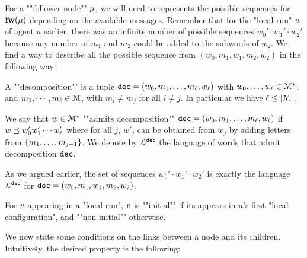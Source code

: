 For a ""follower node"" $\mu$, we will need to represents the possible sequences for $\mathbf{fw}(\mu)$ depending on the available messages. Remember that for the "local run" $u$ of agent $a$ earlier, there was an infinite number of possible sequences $w_0' \cdot w_1' \cdot w_2'$ because any number of $m_1$ and $m_2$ could be added to the subwords of $w_2$. We find a way to describe all the possible sequence from $(w_0, m_1, w_1, m_2, w_2)$ in the following way:

A ""decomposition"" is a tuple $\mathtt{dec} = (w_0, m_1, \ldots, m_\ell, w_\ell)$ with $w_0, \ldots, w_\ell \in \mathcal{M}^*$, and $m_1, \cdots, m_\ell \in \mathcal{M}$, with $m_i \neq m_j$ for all $i\neq j$. In particular we have $\ell \leq |\mathcal{M}|$. 

We say that $w \in \mathcal{M}^*$ ""admits decomposition"" $\mathtt{dec} = (w_0, m_1, \ldots, m_\ell, w_\ell)$ if $w \preceq w'_0 w'_1 \cdots w'_\ell$ where for all $j$, $w'_j$ can be obtained from $w_j$ by adding letters from $\{m_1, \ldots, m_{j-1}\}$.
We denote by $\mathcal{L}^{\mathtt{\mathtt{dec}}}$ the language of words that admit decomposition $\mathtt{dec}$. 

As we argued earlier, the set of sequences $w_0' \cdot w_1' \cdot w_2'$ is exactly the language $\mathcal{L}^{\mathtt{\mathtt{dec}}}$ for $\mathtt{dec} = (w_0, m_1, w_1, m_2, w_2)$.

For $v$ appearing in a "local run", $v$ is ""initial"" if its appears in $u$'s first "local configuration", and ""non-initial"" otherwise. 


We now state some conditions on the links between a node and its children. Intuitively, the desired property is the following: 

